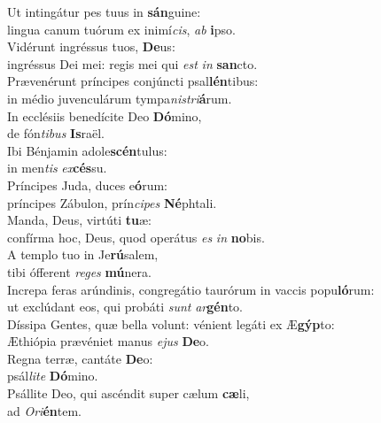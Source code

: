 \oddverse Ut intingátur pes tuus in \textbf{sán}guine:~\*\\
\oddverse lingua canum tuórum ex inimí\textit{cis}, \textit{ab} \textbf{i}pso.\\
\evenverse Vidérunt ingréssus tuos, \textbf{De}us:~\*\\
\evenverse ingréssus Dei mei: regis mei qui \textit{est} \textit{in} \textbf{san}cto.\\
\oddverse Prævenérunt príncipes conjúncti psal\textbf{lén}tibus:~\*\\
\oddverse in médio juvenculárum tympa\textit{ni}\textit{stri}\textbf{á}rum.\\
\evenverse In ecclésiis benedícite Deo \textbf{Dó}mino,~\*\\
\evenverse de fón\textit{ti}\textit{bus} \textbf{Is}raël.\\
\oddverse Ibi Bénjamin adole\textbf{scén}tulus:~\*\\
\oddverse in men\textit{tis} \textit{ex}\textbf{cés}su.\\
\evenverse Príncipes Juda, duces e\textbf{ó}rum:~\*\\
\evenverse príncipes Zábulon, prín\textit{ci}\textit{pes} \textbf{Né}phtali.\\
\oddverse Manda, Deus, virtúti \textbf{tu}æ:~\*\\
\oddverse confírma hoc, Deus, quod operátus \textit{es} \textit{in} \textbf{no}bis.\\
\evenverse A templo tuo in Je\textbf{rú}salem,~\*\\
\evenverse tibi ófferent \textit{re}\textit{ges} \textbf{mú}nera.\\
\oddverse Increpa feras arúndinis, congregátio taurórum in vaccis popu\textbf{ló}rum:~\*\\
\oddverse ut exclúdant eos, qui probáti \textit{sunt} \textit{ar}\textbf{gén}to.\\
\evenverse Díssipa Gentes, quæ bella volunt: vénient legáti ex Æ\textbf{gýp}to:~\*\\
\evenverse Æthiópia prævéniet manus \textit{e}\textit{jus} \textbf{De}o.\\
\oddverse Regna terræ, cantáte \textbf{De}o:~\*\\
\oddverse psál\textit{li}\textit{te} \textbf{Dó}mino.\\
\evenverse Psállite Deo, qui ascéndit super cælum \textbf{cæ}li,~\*\\
\evenverse ad \textit{O}\textit{ri}\textbf{én}tem.\\
